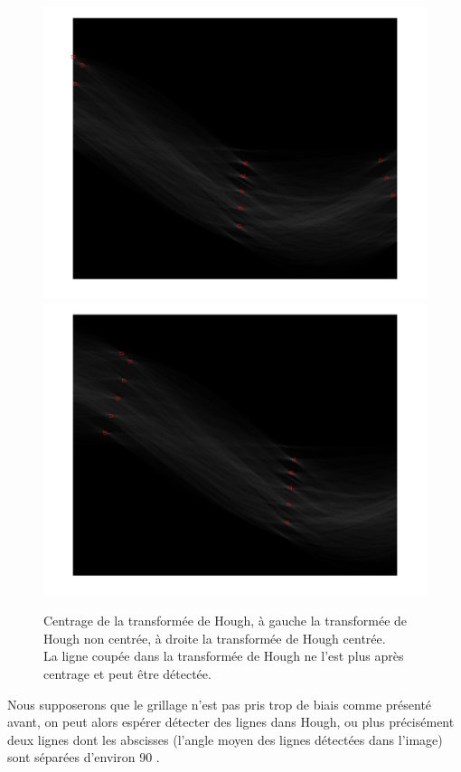 \begin{figure}[h]
\begin{center}
\includegraphics[scale=0.23]{fig/centrageavt.png}
\includegraphics[scale=0.23]{fig/centrageapres.png}
\caption{\label{centrage} Centrage de la transformée de Hough, à gauche la transformée de Hough non centrée, à droite la transformée de Hough centrée.\\ La ligne coupée dans la transformée de Hough ne l'est plus après centrage et peut être détectée.}
\end{center}
\end{figure}

Nous supposerons que le grillage n'est pas pris trop de biais comme présenté avant, on peut alors espérer détecter des lignes dans Hough, ou plus précisément deux lignes dont les abscisses (l'angle moyen des lignes détectées dans l'image) sont séparées d'environ 90 \degre.

